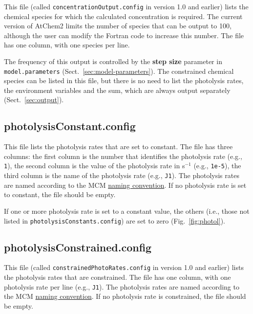 This file (called \texttt{concentrationOutput.config} in version 1.0
and earlier) lists the chemical species for which the calculated
concentration is required. The current version of AtChem2 limits the
number of species that can be output to 100, although the user can
modify the Fortran code to increase this number. The file has one
column, with one species per line.  %

The frequency of this output is controlled by the \textbf{step size}
parameter in \texttt{model.parameters} (Sect.~\ref{sec:model-parameters}).
The constrained chemical species can be listed in this file, but there
is no need to list the photolysis rates, the environment variables and
the  sum, which are always output separately
(Sect.~\ref{sec:output}).

\subsection{photolysisConstant.config} \label{subsec:photolysisconstant}

This file lists the photolysis rates that are set to constant. The
file has three columns: the first column is the number that identifies
the photolysis rate (e.g., \texttt{1}), the second column is the value
of the photolysis rate in s$^{-1}$ (e.g., \texttt{1e-5}), the third column
is the name of the photolysis rate (e.g., \texttt{J1}). The photolysis
rates are named according to the MCM
\href{http://mcm.leeds.ac.uk/MCM/parameters/photolysis.htt}{naming
  convention}.  If no photolysis rate is set to constant, the file
should be empty.

If one or more photolysis rate is set to a constant value, the others
(i.e., those not listed in \texttt{photolysisConstants.config}) are
set to zero (Fig.~\ref{fig:photol}).

\subsection{photolysisConstrained.config} \label{subsec:photolysisconstrained}

This file (called \texttt{constrainedPhotoRates.config} in version 1.0 and
earlier) lists the photolysis rates that are constrained. The file has
one column, with one photolysis rate per line (e.g., \texttt{J1}). The
photolysis rates are named according to the MCM
\href{http://mcm.leeds.ac.uk/MCM/parameters/photolysis.htt}{naming convention}.
If no photolysis rate is constrained, the file should be empty.

